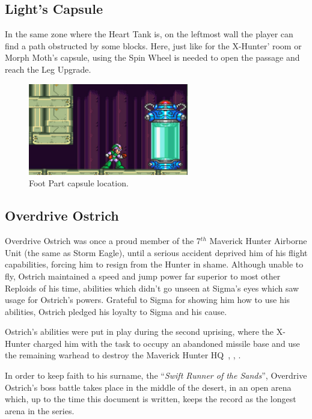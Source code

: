 \subsection{Light's Capsule}\label{X2:Foot_parts}
In the same zone where the Heart Tank is, on the leftmost wall the player can find a path obstructed by some blocks. Here, just like for the X-Hunter' room or Morph Moth's capsule, using the Spin Wheel is needed to open the passage and reach the Leg Upgrade.
\begin{figure}[htp]
	\centering
	\includegraphics[height=4cm]{figures/X2/Overdrive_ostrich/Ostrich_capsule.jpg}
	\caption{Foot Part capsule location.}
\end{figure}

\subsection{Overdrive Ostrich}\label{boss:Overdrive_ostrich}
Overdrive Ostrich was once a proud member of the 7$^{th}$ Maverick Hunter Airborne Unit (the same as Storm Eagle), until a serious accident deprived him of his flight capabilities, forcing him to resign from the Hunter in shame. Although unable to fly, Ostrich maintained a speed and jump power far superior to most other Reploids of his time, abilities which didn't go unseen at Sigma's eyes which saw usage for Ostrich's powers. Grateful to Sigma for showing him how to use his abilities, Ostrich pledged his loyalty to Sigma and his cause.

Ostrich's abilities were put in play during the second uprising, where the X-Hunter charged him with the task to occupy an abandoned missile base and use the remaining warhead to destroy the Maverick Hunter HQ~\cite{Xcoll1:Manual_X2}, \cite{wayback:X2_resources}, \cite{wiki:Overdrive_Ostrich}.

In order to keep faith to his surname, the ``\textit{Swift Runner of the Sands}'', Overdrive Ostrich's boss battle takes place in the middle of the desert, in an open arena which, up to the time this document is written, keeps the record as the longest arena in the series. 


